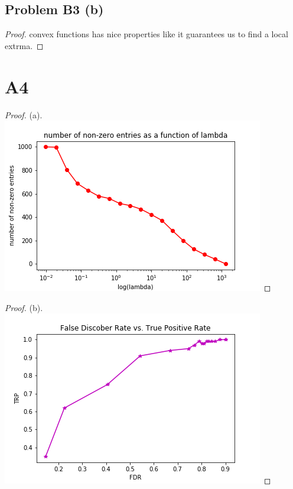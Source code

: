 \documentclass[12pt]{article}
\begin{document}
\subsection*{Problem B3 (b)}
\begin{proof}
        convex functions has nice properties like it guarantees us to find a local extrma.
\end{proof}
\newpage 

\section*{A4}
\begin{proof}
        (a).\\
        \includegraphics{../code/A4_a_linearY.png}
\end{proof}
\newpage
\begin{proof}
        (b).\\
        \includegraphics{../code/A4_b.png}
\end{proof}
\end{document}
